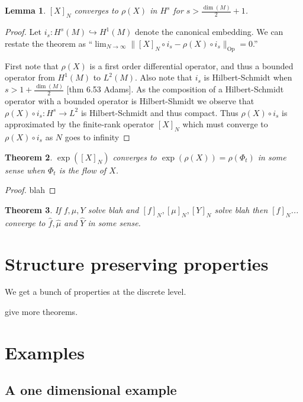 \documentclass[12pt]{amsart}
\newtheorem{thm}{Theorem}[section]
\newtheorem{lem}[thm]{Lemma}
\DeclareMathOperator{\Op}{Op}
\begin{document}
\begin{lem}
	$[X]_N$ converges to $\rho(X)$ in $H^s$ for $s> \frac{\dim(M)}{2}+1$.
\end{lem}

\begin{proof}
	Let $i_s:H^{s}(M) \hookrightarrow H^1(M)$ denote the canonical embedding.
	We can restate the theorem as ``$\lim_{N\to \infty} \| [X]_N \circ i_s - \rho(X) \circ i_s \|_{\Op} = 0$.''
	
	First note that $\rho(X)$ is a first order differential operator, and thus a bounded operator from $H^{1}(M)$ to $L^2(M)$.
	Also note that $i_s$ is Hilbert-Schmidt when $s > 1 + \frac{\dim(M)}{2}$ [thm 6.53 Adams].
	As the composition of a Hilbert-Schmidt operator with a bounded operator is Hilbert-Shmidt 
	we observe that $\rho(X) \circ i_s : H^s \to L^2$ is Hilbert-Schmidt and thus compact.
	Thus $\rho(X) \circ i_s$ is approximated by the finite-rank operator $[X]_N$
	which must converge to $\rho(X) \circ i_s$ as $N$ goes to infinity 
\end{proof}

\begin{thm}
	$\exp([X]_N)$ converges to $\exp( \rho(X) ) = \rho(\Phi_t)$ in some sense when $\Phi_t$ is the flow of $X$.
\end{thm}
\begin{proof}
	blah
\end{proof}

\begin{thm}
	If $f,\mu,Y$ solve blah and $[f]_N,[\mu]_N, [Y]_N$ solve blah
	then $[f]_N$... converge to $\hat{f},\hat{\mu}$ and $\widehat{Y}$ in some sense.
\end{thm}

\section{Structure preserving properties}
\label{sec:structure}
We get a bunch of properties at the discrete level.


give more theorems.

\section{Examples}

\subsection{A one dimensional example}
\end{document}
